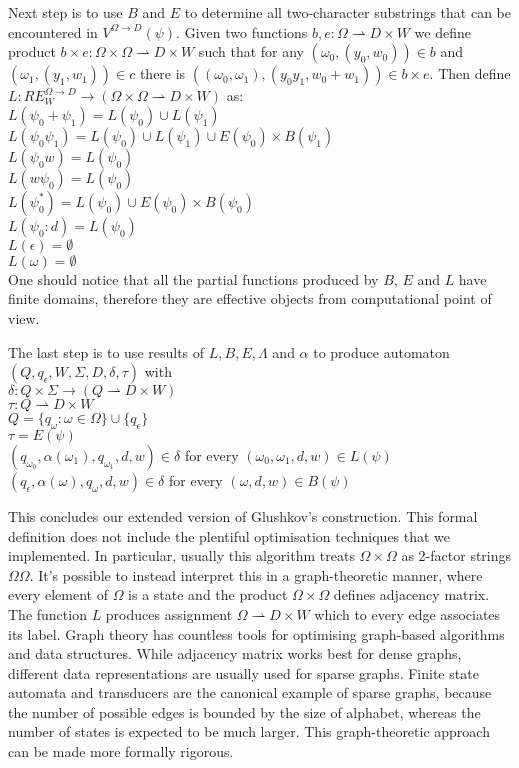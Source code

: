 Next step is to use $B$ and $E$ to determine all two-character substrings that can be encountered in $V^{\Omega\rightarrow D}(\psi)$. Given two functions $b,e:\Omega \rightharpoonup D \times W$ we define product $b \times e : \Omega \times \Omega \rightharpoonup  D \times W$ such that for any $(\omega_0,(y_0,w_0))\in b$ and $(\omega_1,(y_1,w_1)) \in c$ there is $((\omega_0,\omega_1),(y_0y_1,w_0+w_1)) \in b\times e$. Then define $L:RE_W^{\Omega\rightarrow D} \rightarrow (\Omega \times \Omega \rightharpoonup  D \times W)$ as: \\
$L(\psi_0 + \psi_1) = L(\psi_0)\cup L(\psi_1) $ \\
$L(\psi_0 \psi_1) = L(\psi_0) \cup  L(\psi_1) \cup E(\psi_0) \times B(\psi_1)$ \\
$L(\psi_0 w) = L(\psi_0) $ \\
$L(w \psi_0 ) = L(\psi_0)$ \\
$L(\psi_0 ^*) =  L(\psi_0) \cup E(\psi_0) \times B(\psi_0)$ \\
$L(\psi_0 : d) =  L(\psi_0)$ \\
$L(\epsilon) =  \emptyset$ \\
$L(\omega) =  \emptyset$  \\
One should notice that all the partial functions produced by $B$, $E$ and $L$ have finite domains, therefore they are effective objects from computational point of view. 

The last step is to use results of $L,B,E,\Lambda$ and $\alpha$ to produce automaton $(Q,q_\epsilon,W,\Sigma,D,\delta,\tau)$ with \\
$\delta:Q \times \Sigma \rightarrow (Q\rightharpoonup D\times W)$ \\
$\tau:Q\rightharpoonup D \times W$ \\
$Q = \{q_\omega : \omega \in \Omega \} \cup \{q_\epsilon\}$ \\
$\tau = E(\psi)$ \\
$(q_{\omega_0},\alpha(\omega_1),q_{\omega_1},d,w)  \in \delta$ for every $(\omega_0,\omega_1,d,w) \in L(\psi) $ \\
$(q_\epsilon,\alpha(\omega),q_{\omega},d,w)  \in \delta$ for every $(\omega,d,w) \in B(\psi) $ 

This concludes our extended version of Glushkov's construction. This formal definition does not include the plentiful optimisation techniques that we implemented. In particular, usually this algorithm treats $\Omega \times \Omega$ as 2-factor strings $\Omega\Omega$. It's possible to instead interpret this in a graph-theoretic manner, where every element of $\Omega$ is a state and the product $\Omega \times \Omega$ defines adjacency matrix. The function $L$ produces assignment $\Omega \rightharpoonup D \times W$ which to every edge associates its label. Graph theory has countless tools for optimising graph-based algorithms and data structures. While adjacency matrix works best for dense graphs, different data representations are usually used for sparse graphs. Finite state automata and transducers are the canonical example of sparse graphs, because the number of possible edges is bounded by the size of alphabet, whereas the number of states is expected to be much larger. This graph-theoretic approach can be made more formally rigorous.

